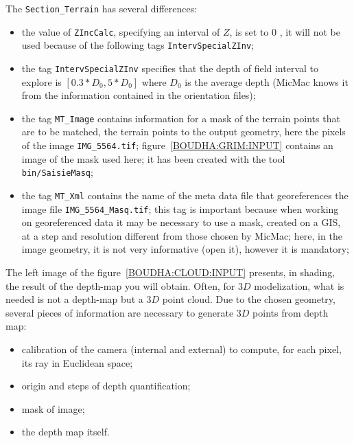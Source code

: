 The {\tt Section\_Terrain} has several differences:


\begin{itemize}
   \item  the value of {\tt ZIncCalc}, specifying an interval of $Z$, is set
          to $0$ , it will not be used because of the following tags {\tt IntervSpecialZInv};

   \item  the tag {\tt IntervSpecialZInv} specifies that the depth of field interval to
          explore is $[0.3*D_0, 5*D_0]$ where $D_0$ is the average depth (MicMac knows it
          from the information contained in the orientation files);

     \item the tag {\tt MT\_Image} contains information for a mask of the terrain points 
     		that are to be matched, the terrain points  to the output geometry,
           here the pixels of the image {\tt IMG\_5564.tif}; figure~\ref{BOUDHA:GRIM:INPUT}
           contains an image of the mask used here; it has been created with the
           tool {\tt bin/SaisieMasq};

     \item the tag {\tt MT\_Xml} contains the name of the meta data file that georeferences
           the image file {\tt IMG\_5564\_Masq.tif}; this tag is important because
           when working on georeferenced data it may be necessary to use a mask,
           created on a GIS, at a step and resolution different from those chosen
           by MicMac; here, in the image geometry, it is not very informative (open it),
           however it is mandatory;
\end{itemize}




The left image of the figure~\ref{BOUDHA:CLOUD:INPUT} presents, in shading,
the result of the depth-map you will obtain. Often,  for $3D$ modelization,
what is needed is not a depth-map but a $3D$ point cloud. Due to the chosen geometry, 
several pieces of information are necessary to generate $3D$ points from
depth map:


\begin{itemize}
  \item  calibration of the camera (internal and external) to compute, for 
         each pixel, its ray in Euclidean space;
  \item  origin and steps of depth quantification;
  \item  mask of image;
  \item   the depth map itself.
\end{itemize}



